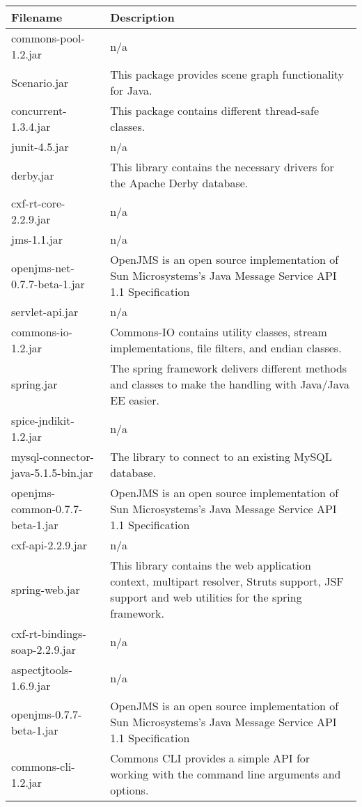 \begin{center}
\begin{longtable}{|p{}|p{}|}
\hline 
Filename & Description\\
\hline
\hline 
commons-pool-1.2.jar & n/a\\
\hline 
Scenario.jar & This package provides scene graph functionality for Java.\\
\hline 
concurrent-1.3.4.jar & This package contains different thread-safe classes.\\
\hline 
junit-4.5.jar & n/a\\
\hline 
derby.jar & This library contains the necessary drivers for the Apache Derby database.\\
\hline 
cxf-rt-core-2.2.9.jar & n/a\\
\hline 
jms-1.1.jar & n/a\\
\hline 
openjms-net-0.7.7-beta-1.jar & OpenJMS is an open source implementation of Sun Microsystems's Java Message Service API 1.1 Specification\\
\hline 
servlet-api.jar & n/a\\
\hline 
commons-io-1.2.jar & Commons-IO contains utility classes, stream implementations, file filters, and endian classes.\\
\hline 
spring.jar & The spring framework delivers different methods and classes to make the handling with Java/Java EE easier.\\
\hline 
spice-jndikit-1.2.jar & n/a\\
\hline 
mysql-connector-java-5.1.5-bin.jar & The library to connect to an existing MySQL database.\\
\hline 
openjms-common-0.7.7-beta-1.jar & OpenJMS is an open source implementation of Sun Microsystems's Java Message Service API 1.1 Specification\\
\hline 
cxf-api-2.2.9.jar & n/a\\
\hline 
spring-web.jar & This library contains the web application context, multipart resolver, Struts support, JSF support and web utilities for the spring framework.\\
\hline 
cxf-rt-bindings-soap-2.2.9.jar & n/a\\
\hline 
aspectjtools-1.6.9.jar & n/a\\
\hline 
openjms-0.7.7-beta-1.jar & OpenJMS is an open source implementation of Sun Microsystems's Java Message Service API 1.1 Specification\\
\hline 
commons-cli-1.2.jar & Commons CLI provides a simple API for working with the command line arguments and options.\\

\end{longtable}
\end{center}
